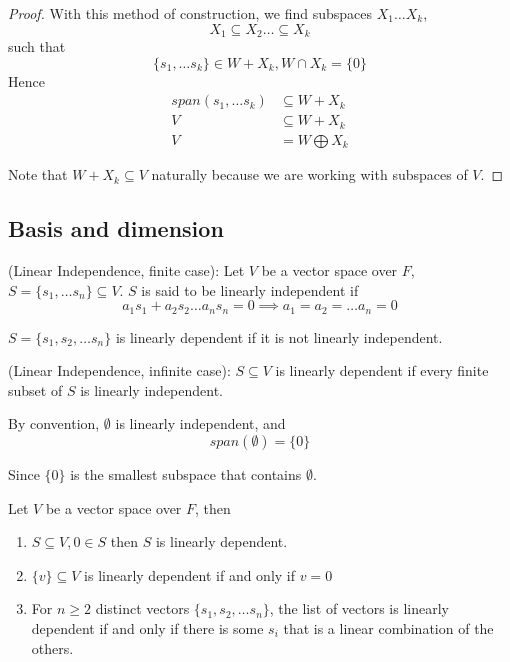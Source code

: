 \begin{proof}
With this method of construction, we find subspaces $X_1 \hdots X_k$, 
\[
  X_1 \subseteq X_2 \hdots \subseteq X_k
\]
such that 
\[
  \{ s_1, \hdots s_k \} \in W+ X_k , W \cap X_k = \{ 0 \} 
\]
Hence 
\begin{align*}
    span(s_1, \hdots s_k) &\subseteq W + X_k \\ 
    V &\subseteq W + X_k \\
    V &= W \bigoplus X_k
\end{align*}

Note that $W + X_k \subseteq V$ naturally because we are working with subspaces of $V$. 
\end{proof}

\subsection{Basis and dimension}

\begin{definition}
    (Linear Independence, finite case): Let $V$ be a vector space over $F$, $S = \{ s_1, \hdots s_n \} \subseteq V$. $S$ is said to be linearly independent if 
    \[
      a_1 s_1 + a_2 s_2 \hdots  a_n s_n = 0 \implies a_1 = a_2 = \hdots a_n = 0
    \]
\end{definition} 

\begin{remark}
$S = \{ s_1, s_2, \hdots s_n \}$ is linearly dependent if it is not linearly independent.
\end{remark}


\begin{definition}
(Linear Independence, infinite case): $S \subseteq V$ is linearly dependent if every finite subset of $S$ is linearly independent.
\end{definition} 

\begin{remark}
By convention, $\emptyset$ is linearly independent, and 
\[
  span \left(  \emptyset \right) = \{ 0 \} 
\]

Since $ \{ 0 \} $ is the smallest subspace that contains $ \emptyset$. \\
\end{remark}

\begin{lemma}
Let $V$ be a vector space over $F$, then 
\begin{enumerate}
  \item $S \subseteq V, 0 \in S$ then $S$ is linearly dependent. 
  \item $\{  v \} \subseteq V$ is linearly dependent if and only if $v = 0$
  \item For $n \geq 2$ distinct vectors $ \{s_1, s_2, \hdots s_n \}$, the list of vectors is linearly dependent if and only if there is some $s_i$ that is a linear combination of the others.
\end{enumerate}
\end{lemma}

